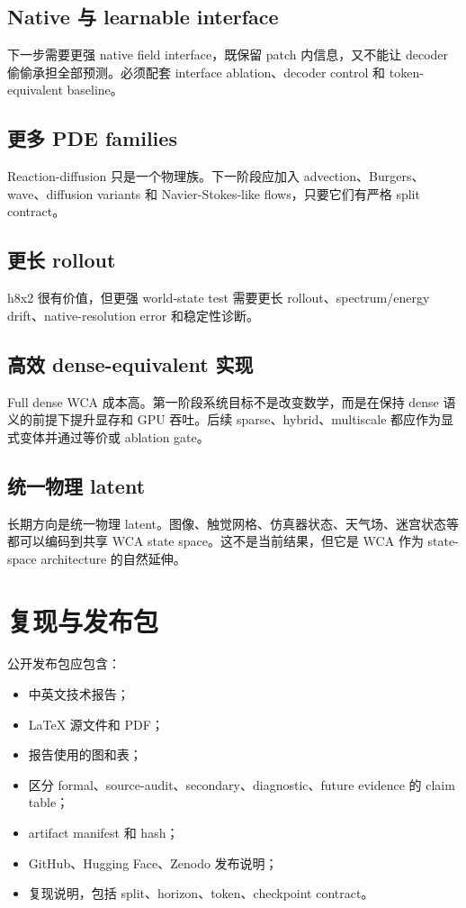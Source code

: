 \documentclass[11pt]{article}
\begin{document}
\subsection{Native 与 learnable interface}

下一步需要更强 native field interface，既保留 patch 内信息，又不能让 decoder 偷偷承担全部预测。必须配套 interface ablation、decoder control 和 token-equivalent baseline。

\subsection{更多 PDE families}

Reaction-diffusion 只是一个物理族。下一阶段应加入 advection、Burgers、wave、diffusion variants 和 Navier-Stokes-like flows，只要它们有严格 split contract。

\subsection{更长 rollout}

h8x2 很有价值，但更强 world-state test 需要更长 rollout、spectrum/energy drift、native-resolution error 和稳定性诊断。

\subsection{高效 dense-equivalent 实现}

Full dense WCA 成本高。第一阶段系统目标不是改变数学，而是在保持 dense 语义的前提下提升显存和 GPU 吞吐。后续 sparse、hybrid、multiscale 都应作为显式变体并通过等价或 ablation gate。

\subsection{统一物理 latent}

长期方向是统一物理 latent。图像、触觉网格、仿真器状态、天气场、迷宫状态等都可以编码到共享 WCA state space。这不是当前结果，但它是 WCA 作为 state-space architecture 的自然延伸。

\section{复现与发布包}

公开发布包应包含：

\begin{itemize}[leftmargin=2em]
  \item 中英文技术报告；
  \item LaTeX 源文件和 PDF；
  \item 报告使用的图和表；
  \item 区分 formal、source-audit、secondary、diagnostic、future evidence 的 claim table；
  \item artifact manifest 和 hash；
  \item GitHub、Hugging Face、Zenodo 发布说明；
  \item 复现说明，包括 split、horizon、token、checkpoint contract。
\end{itemize}
\end{document}

